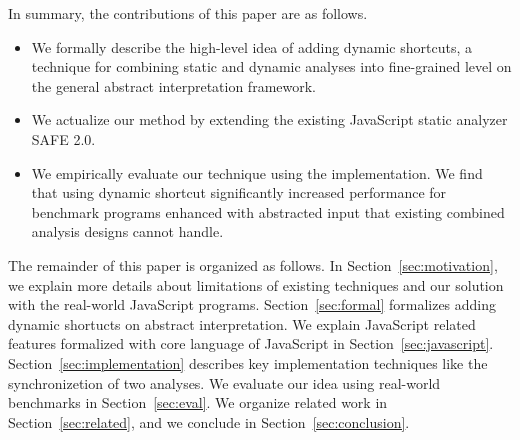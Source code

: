 In summary, the contributions of this paper are as follows.
\begin{itemize}
\item We formally describe the high-level idea of adding dynamic shortcuts, a
  technique for combining static and dynamic analyses into fine-grained level on
  the general abstract interpretation framework.
\item We actualize our method by extending the existing JavaScript static analyzer SAFE 2.0.
\item We empirically evaluate our technique using the implementation.
  We find that using dynamic shortcut significantly increased performance for
  benchmark programs enhanced with abstracted input that existing combined
  analysis designs cannot handle.
\end{itemize}
The remainder of this paper is organized as follows.
In Section~\ref{sec:motivation}, we explain more details about limitations of
existing techniques and our solution with the real-world JavaScript programs.
Section~\ref{sec:formal} formalizes adding dynamic shortucts on abstract
interpretation.
We explain JavaScript related features formalized with core language of
JavaScript in Section~\ref{sec:javascript}.
Section~\ref{sec:implementation} describes key implementation techniques like the synchronizetion of two analyses.
We evaluate our idea using real-world benchmarks in Section~\ref{sec:eval}.
We organize related work in Section~\ref{sec:related}, and we conclude in Section~\ref{sec:conclusion}.


